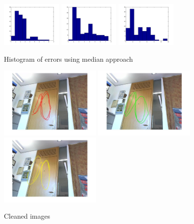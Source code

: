 \documentclass[10pt,a4paper,oneclumn]{article}
\begin{document}
\begin{figure}[h!]
\centering
  \includegraphics[width=3cm]{redHistMedian.jpg}
  \includegraphics[width=3cm]{greenHistMedian.jpg}
  \includegraphics[width=3cm]{yellowHistMedian.jpg}
\caption{Histogram of errors using median approach}
\end{figure}

\begin{figure}[h!]
\centering
  \includegraphics[width=5cm]{redMean.jpg}
  \includegraphics[width=5cm]{greenMean.jpg}
  \includegraphics[width=5cm]{yellowMean.jpg}
\caption{Cleaned images}
\end{figure}
\end{document}
